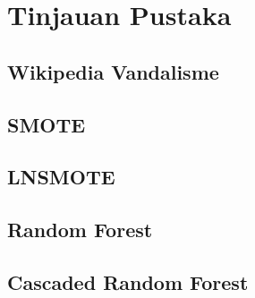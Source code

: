 \chapter{Tinjauan Pustaka}

\section{Wikipedia Vandalisme}



\section{SMOTE}



\section{LNSMOTE}

\section{Random Forest}
\section{Cascaded Random Forest}
